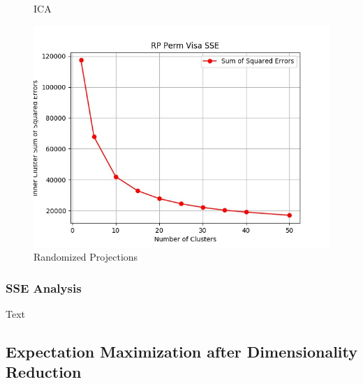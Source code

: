 \documentclass[h]{article}
\begin{document}
\begin{figure}[H]
      \caption*{ICA} 
   \endminipage\hfill
      \includegraphics[width=1\textwidth,keepaspectratio]{rp_perm_visa_sse.jpg} 
      \caption*{Randomized Projections} 
   \endminipage\hfill
\end{figure}

\subsubsection*{SSE Analysis}
Text

\subsection*{Expectation Maximization after Dimensionality Reduction}
\end{document}
